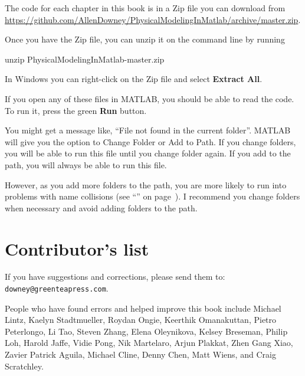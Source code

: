 

The code for each chapter in this book is in a Zip file you can download from \url{https://github.com/AllenDowney/PhysicalModelingInMatlab/archive/master.zip}.

Once you have the Zip file, you can unzip it on the command line by running

\begin{code}
unzip PhysicalModelingInMatlab-master.zip
\end{code}

In Windows you can right-click on the Zip file and select \textbf{Extract All}.

If you open any of these files in MATLAB, you should be able to read the code.  To run it, press the green \textbf{Run} button.

You might get a message like, ``File not found in the current folder''.
MATLAB will give you the option to Change Folder or Add to Path.  If you change folders, you will be able to run this file until you change folder again.  If you add to the path, you will always be able to run this file.

However, as you add more folders to the path, you are more likely to run into problems with name collisions (see ``'' on page~\pageref{collision}).
I recommend you change folders when necessary and avoid adding folders to the path.


\newpage

\section*{Contributor's list}

If you have suggestions and corrections, please send them to:\\
\verb"downey@greenteapress.com".


People who have found errors and helped improve this book include
Michael Lintz, 
Kaelyn Stadtmueller, 
Roydan Ongie, 
Keerthik Omanakuttan, 
Pietro Peterlongo, 
Li Tao, 
Steven Zhang, 
Elena Oleynikova, 
Kelsey Breseman, 
Philip Loh, 
Harold Jaffe, 
Vidie Pong, 
Nik Martelaro, 
Arjun Plakkat, 
Zhen Gang Xiao, 
Zavier Patrick Aguila, 
Michael Cline,
Denny Chen,
Matt Wiens,
and Craig Scratchley.

\newpage
